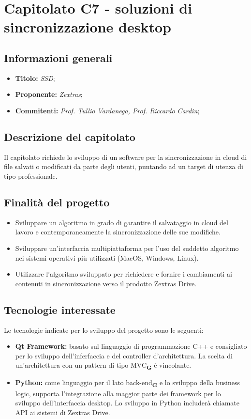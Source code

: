 \section{Capitolato C7 - soluzioni di sincronizzazione desktop}
\subsection{Informazioni generali}
\begin{itemize}
    \item \textbf{Titolo:} \textit{SSD};
    \item \textbf{Proponente:} \textit{Zextras};
    \item \textbf{Commitenti:} \textit{Prof. Tullio Vardanega, Prof. Riccardo Cardin};
\end{itemize}
\subsection{Descrizione del capitolato}
Il capitolato richiede lo sviluppo di un software per la sincronizzazione in cloud di file salvati o modificati da parte degli utenti, puntando ad un target di utenza di tipo professionale.
\subsection{Finalità del progetto}
\begin{itemize}
    \item Sviluppare un algoritmo in grado di garantire
    il salvataggio in cloud del lavoro e contemporaneamente la sincronizzazione
    delle sue modifiche.
    \item Sviluppare un’interfaccia multipiattaforma per l’uso
    del suddetto algoritmo nei sistemi operativi più utilizzati (MacOS,
    Windows, Linux).
    \item  Utilizzare l’algoritmo sviluppato per richiedere e fornire i
    cambiamenti ai contenuti in sincronizzazione verso il prodotto Zextras
    Drive.
\end{itemize}
\subsection{Tecnologie interessate}
Le tecnologie indicate per lo sviluppo del progetto sono le seguenti:
    \begin{itemize}
        \item \textbf{Qt Framework:} basato sul linguaggio di programmazione C++ e consigliato per lo sviluppo dell'inferfaccia e del controller d'architettura. La scelta di un'architettura con un pattern di tipo MVC\textsubscript{\textbf{G}} è vincolante.
        \item \textbf{Python:} come linguaggio per il lato back-end\textsubscript{\textbf{G}} e lo sviluppo della business logic, supporta l'integrazione alla maggior parte dei framework per lo sviluppo dell'interfaccia desktop. Lo sviluppo in Python includerà chiamate API ai sistemi di Zextras Drive.
    \end{itemize}
